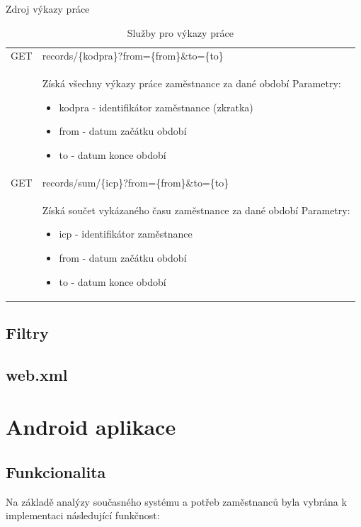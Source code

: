 \documentclass{bakalarka}
\begin{document}
Zdroj výkazy práce
\begin{table}[H]
\begin{center}
\begin{tabular}{| m{2cm} |  m{10cm} |}
\hline
\rowcolor{Gray}
GET  &records/\{kodpra\}?from=\{from\}\&to=\{to\} \\ 
&  \parbox{10cm}{Získá všechny výkazy práce zaměstnance za dané období\\
Parametry:\begin{itemize}[noitemsep,nolistsep]
\item kodpra - identifikátor zaměstnance (zkratka)
\item from - datum začátku období
\item to - datum konce období
\end{itemize}} \\ \hline
{}
GET & records/sum/\{icp\}?from=\{from\}\&to=\{to\} \\ \hline
&  \parbox{10cm}{Získá součet vykázaného času zaměstnance za dané období\\
Parametry:\begin{itemize}[noitemsep,nolistsep]
\item icp - identifikátor zaměstnance
\item from - datum začátku období
\item to - datum konce období
\end{itemize}} \\ \hline
\end{tabular}
\end{center}
\caption{Služby pro výkazy práce}
\label{tab:urirecords}
\end{table}

\section{Filtry}

\section{web.xml}

\chapter{Android aplikace}

\section{Funkcionalita}
Na základě analýzy současného systému a potřeb zaměstnanců byla vybrána k implementaci následující funkčnost: 
\end{document}
